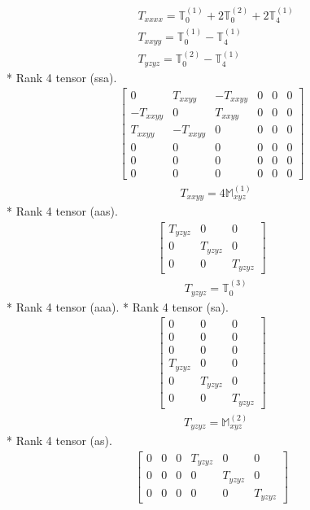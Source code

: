 \documentclass[fleqn,8pt,landscape]{jsarticle}
\begin{document}
\begin{align*}
& T_{xxxx} = \mathbb{T}_{0}^{(1)} + 2 \mathbb{T}_{0}^{(2)} + 2 \mathbb{T}_{4}^{(1)} \\
& T_{xxyy} = \mathbb{T}_{0}^{(1)} - \mathbb{T}_{4}^{(1)} \\
& T_{yzyz} = \mathbb{T}_{0}^{(2)} - \mathbb{T}_{4}^{(1)}
\end{align*}
* Rank 4 tensor (ssa).
\begin{align*}
\begin{bmatrix} 0 & T_{xxyy} & - T_{xxyy} & 0 & 0 & 0 \\ - T_{xxyy} & 0 & T_{xxyy} & 0 & 0 & 0 \\ T_{xxyy} & - T_{xxyy} & 0 & 0 & 0 & 0 \\ 0 & 0 & 0 & 0 & 0 & 0 \\ 0 & 0 & 0 & 0 & 0 & 0 \\ 0 & 0 & 0 & 0 & 0 & 0 \end{bmatrix}
\end{align*}
\begin{align*}
& T_{xxyy} = 4 \mathbb{M}_{xyz}^{(1)}
\end{align*}
* Rank 4 tensor (aas).
\begin{align*}
\begin{bmatrix} T_{yzyz} & 0 & 0 \\ 0 & T_{yzyz} & 0 \\ 0 & 0 & T_{yzyz} \end{bmatrix}
\end{align*}
\begin{align*}
& T_{yzyz} = \mathbb{T}_{0}^{(3)}
\end{align*}
* Rank 4 tensor (aaa).
* Rank 4 tensor (sa).
\begin{align*}
\begin{bmatrix} 0 & 0 & 0 \\ 0 & 0 & 0 \\ 0 & 0 & 0 \\ T_{yzyz} & 0 & 0 \\ 0 & T_{yzyz} & 0 \\ 0 & 0 & T_{yzyz} \end{bmatrix}
\end{align*}
\begin{align*}
& T_{yzyz} = \mathbb{M}_{xyz}^{(2)}
\end{align*}
* Rank 4 tensor (as).
\begin{align*}
\begin{bmatrix} 0 & 0 & 0 & T_{yzyz} & 0 & 0 \\ 0 & 0 & 0 & 0 & T_{yzyz} & 0 \\ 0 & 0 & 0 & 0 & 0 & T_{yzyz} \end{bmatrix}
\end{align*}
\end{document}
